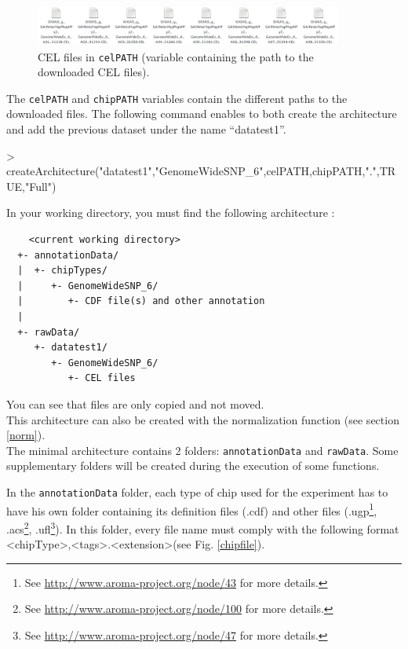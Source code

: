 \documentclass[a4paper,10pt]{article}
\begin{document}
		\begin{figure}[!h]
			\centering
			\includegraphics[width=0.9\textwidth]{fig/dataFilesSingle2}
			\caption{CEL files in \texttt{celPATH} (variable containing the path to the downloaded CEL  files).}%
			\label{datafileSingle2}
		\end{figure}
		
		The \texttt{celPATH} and \texttt{chipPATH} variables contain the different paths to the downloaded files. The following command enables to both create the architecture and add the previous dataset under the name ``datatest1''.
\begin{Schunk}
\begin{Sinput}
> createArchitecture("datatest1","GenomeWideSNP_6",celPATH,chipPATH,".",TRUE,"Full")
\end{Sinput}
\end{Schunk}
		
		
		In your working directory, you must find the following architecture :
		
		\begin{verbatim}
	<current working directory>
  +- annotationData/
  |  +- chipTypes/
  |     +- GenomeWideSNP_6/ 
  |        +- CDF file(s) and other annotation 
  |
  +- rawData/
     +- datatest1/
        +- GenomeWideSNP_6/ 
           +- CEL files
		\end{verbatim}
		
		You can see that files are only copied and not moved.
		~~\\
		This architecture can also be created with the normalization function (see section \ref{norm}).\\
    
    The minimal architecture contains 2 folders: \texttt{annotationData} and \texttt{rawData}. Some supplementary folders will be created during the execution of some functions.

		In the \texttt{annotationData} folder, each type of chip used for the experiment has to have his own folder containing its definition files (.cdf) and other files (.ugp\footnote{See \url{http://www.aroma-project.org/node/43} for more details.}, .acs\footnote{See \url{http://www.aroma-project.org/node/100} for more details.}, .ufl\footnote{See \url{http://www.aroma-project.org/node/47} for more details.}). In this folder, every file name must comply with the following format <chipType>,<tags>.<extension>(see Fig. \ref{chipfile}).
		
\end{document}
